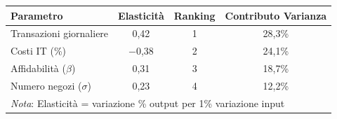 \documentclass[border=10pt]{standalone}
\begin{document}

\centering

\begin{tabular}{@{}lccc@{}}
\toprule
\textbf{Parametro} & \textbf{Elasticità} & \textbf{Ranking} & \textbf{Contributo Varianza} \\
\midrule
Transazioni giornaliere & 0,42 & 1 & 28,3\% \\
Costi IT (\%) & $-$0,38 & 2 & 24,1\% \\
Affidabilità ($\beta$) & 0,31 & 3 & 18,7\% \\
Numero negozi ($\sigma$) & 0,23 & 4 & 12,2\% \\
\bottomrule
\multicolumn{4}{l}{\small \textit{Nota}: Elasticità = variazione \% output per 1\% variazione input}
\end{tabular}
\end{document}
